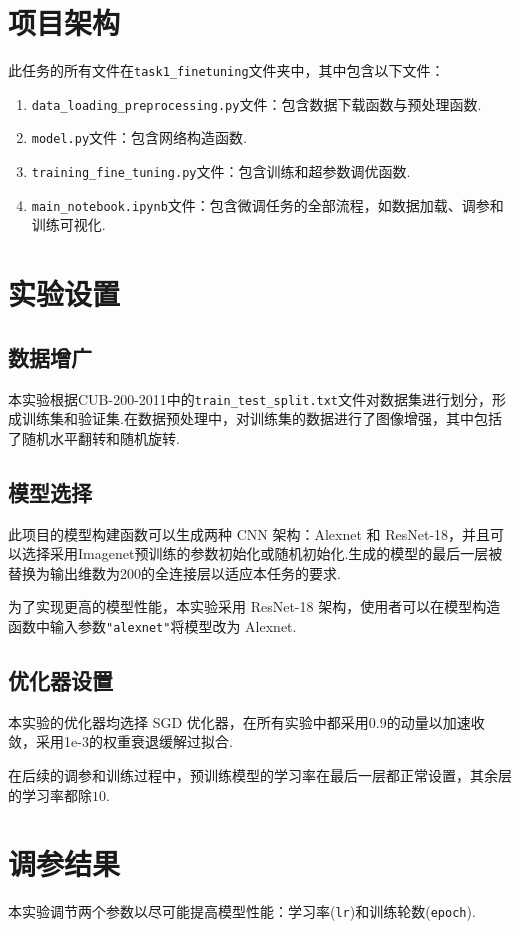 \documentclass[notitlepage,cs4size,punct,oneside]{ctexrep}
\numberwithin{equation}{chapter}
\theoremstyle{mystyle}
\begin{document}
\section{项目架构}
此任务的所有文件在\texttt{task1\_finetuning}文件夹中，其中包含以下文件：
\begin{enumerate}
\item \texttt{data\_loading\_preprocessing.py}文件：包含数据下载函数与预处理函数.
\item \texttt{model.py}文件：包含网络构造函数.
\item \texttt{training\_fine\_tuning.py}文件：包含训练和超参数调优函数.
\item \texttt{main\_notebook.ipynb}文件：包含微调任务的全部流程，如数据加载、调参和训练可视化.
\end{enumerate}

\section{实验设置}
\subsection{数据增广}
本实验根据CUB-200-2011中的\texttt{train\_test\_split.txt}文件对数据集进行划分，形成训练集和验证集.在数据预处理中，对训练集的数据进行了图像增强，其中包括了随机水平翻转和随机旋转.

\subsection{模型选择}
此项目的模型构建函数可以生成两种 CNN 架构：Alexnet 和 ResNet-18，并且可以选择采用Imagenet预训练的参数初始化或随机初始化.生成的模型的最后一层被替换为输出维数为200的全连接层以适应本任务的要求.

为了实现更高的模型性能，本实验采用 ResNet-18 架构，使用者可以在模型构造函数中输入参数\texttt{"alexnet"}将模型改为 Alexnet.

\subsection{优化器设置}
本实验的优化器均选择 SGD 优化器，在所有实验中都采用0.9的动量以加速收敛，采用1e-3的权重衰退缓解过拟合.

在后续的调参和训练过程中，预训练模型的学习率在最后一层都正常设置，其余层的学习率都除$10$.


\section{调参结果}
本实验调节两个参数以尽可能提高模型性能：学习率(\texttt{lr})和训练轮数(\texttt{epoch}).
\end{document}

